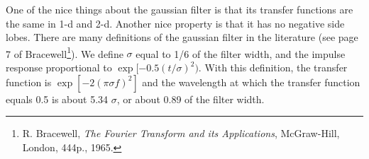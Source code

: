 \clearpage


One of the nice things about the gaussian filter is that its
transfer functions are the same in 1-d and 2-d.  Another nice
property is that it has no negative side lobes.  There are many 
definitions of the gaussian filter in the literature (see page
7 of Bracewell\footnote{R. Bracewell, \emph{The Fourier Transform
and its Applications}, McGraw-Hill, London, 444p., 1965.}).  We
define $\sigma$ equal to 1/6 of the filter width, and the impulse
response proportional to $\exp[-0.5(t/\sigma)^2)$.  With this
definition, the transfer function is $\exp[-2(\pi\sigma f)^2]$
and the wavelength at which the transfer function equals 0.5 is 
about 5.34 $\sigma$, or about 0.89 of the filter width.


